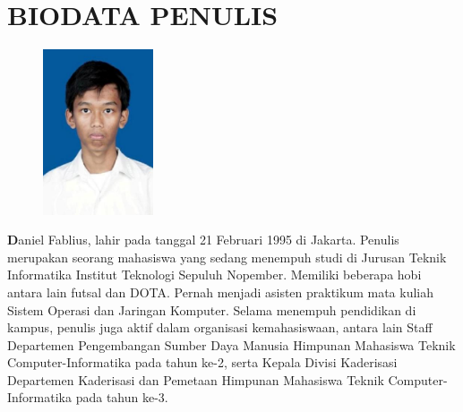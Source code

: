 	\chapter{BIODATA PENULIS}
		\begin{figure}
			\includegraphics[width=0.29\textwidth]{images/cover/pic}
		\end{figure}		
		\textbf Daniel Fablius, lahir pada tanggal 21 Februari 1995 di Jakarta. Penulis merupakan seorang mahasiswa yang sedang menempuh studi di Jurusan Teknik Informatika Institut Teknologi Sepuluh Nopember. Memiliki beberapa hobi antara lain futsal dan DOTA. Pernah menjadi asisten praktikum mata kuliah Sistem Operasi dan Jaringan Komputer. Selama menempuh pendidikan di kampus, penulis juga aktif dalam organisasi kemahasiswaan, antara lain Staff Departemen Pengembangan Sumber Daya Manusia Himpunan Mahasiswa Teknik Computer-Informatika pada tahun ke-2, serta Kepala Divisi Kaderisasi Departemen Kaderisasi dan Pemetaan Himpunan Mahasiswa Teknik Computer-Informatika pada tahun ke-3.
